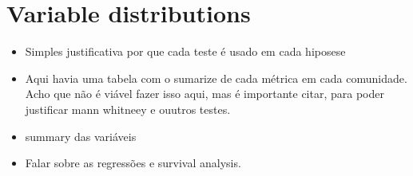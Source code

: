 \section{Variable distributions}
\label{sub:distributions}
\begin{itemize}
	\item Simples justificativa por que cada teste é usado em cada hiposese
	\item Aqui havia uma tabela com o sumarize de cada métrica em cada comunidade. Acho que não é viável fazer isso aqui, mas é importante citar, para poder  justificar mann whitneey e ouutros testes.
	\item summary das variáveis
	\item Falar sobre as regressões e survival analysis. 
\end{itemize}

